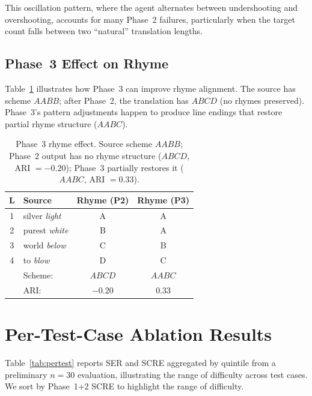 \documentclass[11pt]{article}
\begin{document}
This oscillation pattern, where the agent alternates between undershooting and overshooting, accounts for many Phase~2 failures, particularly when the target count falls between two ``natural'' translation lengths.

\subsection{Phase~3 Effect on Rhyme}

Table~\ref{tab:ex-rhyme} illustrates how Phase~3 can improve rhyme alignment.
The source has scheme $AABB$; after Phase~2, the translation has $ABCD$ (no rhymes preserved).
Phase~3's pattern adjustments happen to produce line endings that restore partial rhyme structure ($AABC$).

\begin{table}[h]
\centering
\small
\begin{tabular}{@{}clcc@{}}
\toprule
\textbf{L} & \textbf{Source} & \textbf{Rhyme (P2)} & \textbf{Rhyme (P3)} \\
\midrule
1 & silver \emph{light} & A & A \\
2 & purest \emph{white} & B & A \\
3 & world \emph{below} & C & B \\
4 & to \emph{blow} & D & C \\
\midrule
& Scheme: & $ABCD$ & $AABC$ \\
& ARI: & $-0.20$ & $0.33$ \\
\bottomrule
\end{tabular}
\caption{Phase~3 rhyme effect. Source scheme $AABB$; Phase~2 output has no rhyme structure ($ABCD$, ARI $= -0.20$); Phase~3 partially restores it ($AABC$, ARI $= 0.33$).}
\label{tab:ex-rhyme}
\end{table}

\section{Per-Test-Case Ablation Results}
\label{app:pertest}

Table~\ref{tab:pertest} reports SER and SCRE aggregated by quintile from a preliminary $n{=}30$ evaluation, illustrating the range of difficulty across test cases.
We sort by Phase~1+2 SCRE to highlight the range of difficulty.
\end{document}
